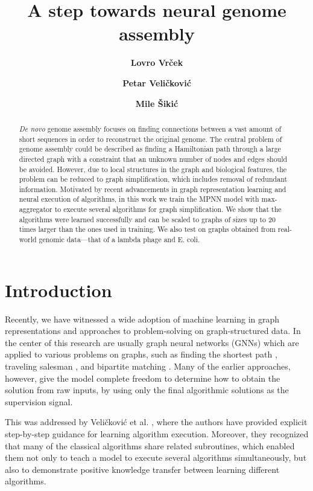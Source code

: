 \documentclass{article}
\title{A step towards neural genome assembly}
\author[1,2]{\textbf{Lovro Vrček}}
\author[3]{\textbf{Petar Veličković}}
\author[1,2]{\textbf{Mile Šikić}}
\affil[1]{Genome Institute of Singapore, A*STAR, Singapore}
\affil[2]{Faculty of Electrical Engineering and Computing, University of Zagreb, Croatia}
\affil[3]{DeepMind \authorcr \tt \{vrcekl, miles\}@gis.a-star.edu.sg }
\begin{document}
\maketitle

\begin{abstract}
    \textit{De novo} genome assembly focuses on finding connections between a vast amount of short sequences in order to reconstruct the original genome. The central problem of genome assembly could be described as finding a Hamiltonian path through a large directed graph with a constraint that an unknown number of nodes and edges should be avoided. However, due to local structures in the graph and biological features, the problem can be reduced to graph simplification, which includes removal of redundant information. Motivated by recent advancements in graph representation learning and neural execution of algorithms, in this work we train the MPNN model with max-aggregator to execute several algorithms for graph simplification. We show that the algorithms were learned successfully and can be scaled to graphs of sizes up to 20 times larger than the ones used in training. We also test on graphs obtained from real-world genomic data---that of a lambda phage and E. coli.
\end{abstract}


\section{Introduction}

Recently, we have witnessed a wide adoption of machine learning in graph representations and approaches to problem-solving on graph-structured data. In the center of this research are usually graph neural networks (GNNs) \cite{scarselli2008graph, gilmer2017neural} which are applied to various problems on graphs, such as finding the shortest path \cite{graves2016hybrid, xu2019can}, traveling salesman \cite{vinyals2015pointer, joshi2019efficient}, and bipartite matching \cite{georgiev2020neural}. Many of the earlier approaches, however, give the model complete freedom to determine how to obtain the solution from raw inputs, by using only the final algorithmic solutions as the supervision signal.

This was addressed by Veličković et al. \cite{velivckovic2019neural}, where the authors have provided explicit step-by-step guidance for learning algorithm execution. Moreover, they recognized that many of the classical algorithms share related subroutines, which enabled them not only to teach a model to execute several algorithms simultaneously, but also to demonstrate positive knowledge transfer between learning different algorithms.
\end{document}
